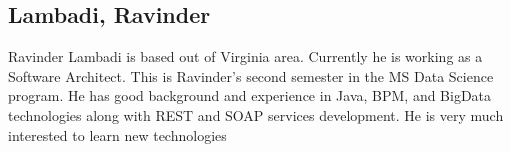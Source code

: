 \subsection{Lambadi, Ravinder}
Ravinder Lambadi is based out of Virginia area. Currently he is working as a Software Architect. This is Ravinder's second semester in the MS Data Science program. He has good background and experience in Java, BPM, and BigData technologies along with REST and SOAP services development. He is very much interested to learn new technologies
